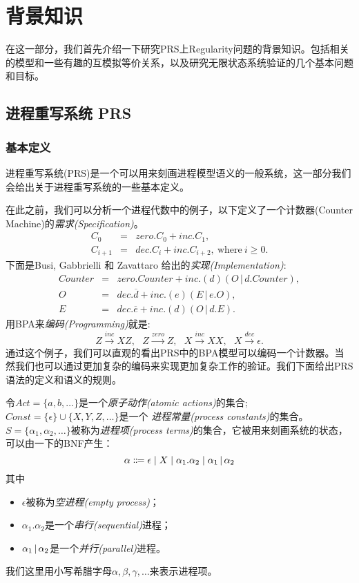\chapter{背景知识}
\label{chap:pre}

在这一部分，我们首先介绍一下研究PRS上Regularity问题的背景知识。包括相关的模型和一些有趣的互模拟等价关系，以及研究无限状态系统验证的几个基本问题和目标。

\section{进程重写系统 PRS}
\label{sec:prs}

\subsection{基本定义}
\label{subsec:basic-def}

进程重写系统(PRS)是一个可以用来刻画进程模型语义的一般系统，这一部分我们会给出关于进程重写系统的一些基本定义。\cite{Mayr2000}

在此之前，我们可以分析一个进程代数中的例子\cite{Milner1989}，以下定义了一个计数器(Counter Machine)的\emph{需求(Specification)}。
\begin{eqnarray*}
C_{0} &=& zero.C_{0}+inc.C_{1}, \\
C_{i+1} &=& dec.C_{i}+inc.C_{i+2},\ \mathrm{where}\ i\ge0.
\end{eqnarray*}
下面是Busi, Gabbrielli 和 Zavattaro 给出的\emph{实现(Implementation)}\cite{Busi2003}:
\begin{eqnarray*}
Counter &=& zero.Counter+inc.(d)(O\,|\,d.Counter), \\
O &=& dec.\overline{d}+inc.(e)(E\,|\,e.O), \\
E &=& dec.\overline{e}+inc.(d)(O\,|\,d.E).
\end{eqnarray*}
用BPA来\emph{编码(Programming)}就是:
\[
Z \stackrel{inc}{\longrightarrow} XZ, \ \ \
Z \stackrel{zero}{\longrightarrow} Z, \ \ \
X \stackrel{inc}{\longrightarrow} XX, \ \ \
X \stackrel{dec}{\longrightarrow} \epsilon.
\]
通过这个例子，我们可以直观的看出PRS中的BPA模型可以编码一个计数器。当然我们也可以通过更加复杂的编码来实现更加复杂工作的验证。我们下面给出PRS语法的定义和语义的规则。

\begin{defn}\label{def:process-term}
令$Act=\{a,b,\ldots\}$是一个\emph{原子动作(atomic actions)}的集合;$Const=\{\epsilon\}\cup\{X,Y,Z,\ldots\}$是一个 \emph{进程常量(process constants)}的集合。
$S=\{\alpha_1,\alpha_2,\ldots\}$被称为\emph{进程项(process terms)}的集合，它被用来刻画系统的状态，可以由一下的BNF产生：
$$\alpha\Coloneqq \epsilon\mid X\mid \alpha_1.\alpha_2\mid \alpha_1\,|\, \alpha_2$$
其中
\begin{itemize}
\item $\epsilon$被称为\emph{空进程(empty process)}；
\item $\alpha_1.\alpha_2$是一个\emph{串行(sequential)}进程；
\item $\alpha_1\,|\, \alpha_2$是一个\emph{并行(parallel)}进程。
\end{itemize}
我们这里用小写希腊字母$\alpha,\beta,\gamma,\ldots$来表示进程项。
\end{defn}


